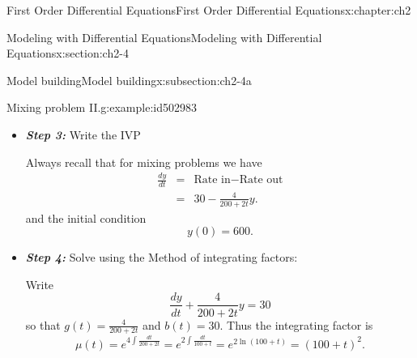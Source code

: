 \documentclass[oneside,10pt,]{book}
\newcommand{\alert}[1]{\textbf{\textit{#1}}}
\numberwithin{equation}{section}
\numberwithin{equation}{section}
\newcommand{\amp}{&}
\begin{document}
\begin{chapterptx}{First Order Differential Equations}{}{First Order Differential Equations}{}{}{x:chapter:ch2}
\begin{sectionptx}{Modeling with Differential Equations}{}{Modeling with Differential Equations}{}{}{x:section:ch2-4}
\begin{subsectionptx}{Model building}{}{Model building}{}{}{x:subsection:ch2-4a}
\begin{example}{Mixing problem II.}{g:example:id502983}
\begin{itemize}[label=\textbullet]
We have%
\begin{align*}
\text{Rate in}\amp = \amp \underset{\mbox{-sugar water solution}}{\left(5\frac{\mbox{pounds}}{\mbox{gallon}}\right)\left(6\frac{\mbox{gallons}}{\mbox{min}}\right)}\\
\amp = \amp 30\frac{\mbox{pounds}}{\mbox{gallon}}.
\end{align*}
%
\par
To find the concentration of sugar coming out we have know the amount of water at time \(t\).%
\begin{align*}
\mbox{Water at time }t \amp = \amp 200\mbox{ gallons}+\left(6\frac{\mbox{gallons}}{\mbox{min}}-4\frac{\mbox{gallons}}{\mbox{min}}\right)t\\
\amp = \amp 200+2t,
\end{align*}
So%
\begin{align*}
\mbox{Rate out} \amp = \amp \left(\begin{array}{c}
\mbox{concentration}\\
\mbox{of stuff going out}
\end{array}\right)\times\mbox{Rate}\\
\amp = \amp \left(\frac{y(t)}{200+2t}\frac{\text{pounds}}{\text{gallon}}\right)\times4\frac{\mbox{gallons}}{\mbox{min}}.\\
\amp = \amp 4\frac{y(t)}{200+2t}\frac{\text{pound}}{\text{min}}.
\end{align*}
%
\item{}\alert{Step 3:} Write the IVP%
\par
Always recall that for mixing problems we have%
\begin{align*}
\frac{dy}{dt} \amp = \amp \mbox{Rate in}-\mbox{Rate out}\\
\amp = \amp 30-\frac{4}{200+2t}y.
\end{align*}
and the initial condition%
\begin{equation*}
y(0)=600.
\end{equation*}
%
\item{}\alert{Step 4:} Solve using the Method of integrating factors:%
\par
Write%
\begin{equation*}
\frac{dy}{dt}+\frac{4}{200+2t}y=30
\end{equation*}
so that \(g(t)=\frac{4}{200+2t}\) and \(b(t)=30\). Thus the integrating factor is%
\begin{equation*}
\mu(t)=e^{4\int\frac{dt}{200+2t}}=e^{2\int\frac{dt}{100+t}}=e^{2\ln\left(100+t\right)}=\left(100+t\right)^{2}.
\end{equation*}

\end{itemize}
\end{example}
\end{subsectionptx}
\end{sectionptx}
\end{chapterptx}
\end{document}
